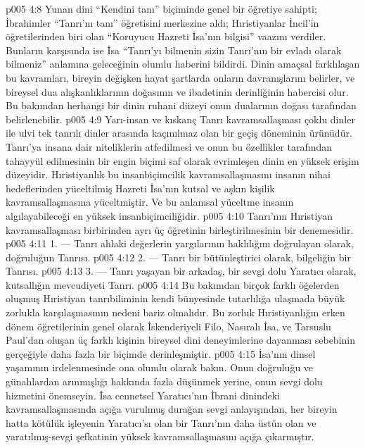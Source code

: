 \vs p005 4:8 Yunan dini “Kendini tanı” biçiminde genel bir öğretiye sahipti; İbrahimler “Tanrı’nı tanı” öğretisini merkezine aldı; Hıristiyanlar İncil’in öğretilerinden biri olan “Koruyucu Hazreti İsa’nın bilgisi” vaazını verdiler. Bunların karşısında ise İsa “Tanrı’yı bilmenin sizin Tanrı’nın bir evladı olarak bilmeniz” anlamına geleceğinin olumlu haberini bildirdi. Dinin amaçsal farklılaşan bu kavramları, bireyin değişken hayat şartlarda onların davranışlarını belirler, ve bireysel dua alışkanlıklarının doğasının ve ibadetinin derinliğinin habercisi olur. Bu bakımdan herhangi bir dinin ruhani düzeyi onun dualarının doğası tarafından belirlenebilir.
\vs p005 4:9 Yarı\hyp{}insan ve kıskanç Tanrı kavramsallaşması çoklu dinler ile ulvi tek tanrılı dinler arasında kaçınılmaz olan bir geçiş döneminin ürünüdür. Tanrı’ya insana dair niteliklerin atfedilmesi ve onun bu özellikler tarafından tahayyül edilmesinin bir engin biçimi saf olarak evrimleşen dinin en yüksek erişim düzeyidir. Hıristiyanlık bu insanbiçimcilik kavramsallaşmasını insanın nihai hedeflerinden yüceltilmiş Hazreti İsa’nın kutsal ve aşkın kişilik kavramsallaşmasına yüceltmiştir. Ve bu anlamsal yüceltme insanın algılayabileceği en yüksek insanbiçimciliğidir.
\vs p005 4:10 Tanrı’nın Hıristiyan kavramsallaşması birbirinden ayrı üç öğretinin birleştirilmesinin bir denemesidir.
\vs p005 4:11 1.\bibnobreakspace {} --- Tanrı ahlaki değerlerin yargılarının haklılığını doğrulayan olarak, doğruluğun Tanrısı.
\vs p005 4:12 2.\bibnobreakspace {} --- Tanrı bir bütünleştirici olarak, bilgeliğin bir Tanrısı.
\vs p005 4:13 3.\bibnobreakspace {} --- Tanrı yaşayan bir arkadaş, bir sevgi dolu Yaratıcı olarak, kutsallığın mevcudiyeti Tanrı.
\vs p005 4:14 Bu bakımdan birçok farklı öğelerden oluşmuş Hıristiyan tanrıbiliminin kendi bünyesinde tutarlılığa ulaşmada büyük zorlukla karşılaşmasının nedeni bariz olmalıdır. Bu zorluk Hıristiyanlığın erken dönem öğretilerinin genel olarak İskenderiyeli Filo, Nasıralı İsa, ve Tarsuslu Paul’dan oluşan üç farklı kişinin bireysel dini deneyimlerine dayanması sebebinin gerçeğiyle daha fazla bir biçimde derinleşmiştir.
\vs p005 4:15 İsa’nın dinsel yaşamının irdelenmesinde ona olumlu olarak bakın. Onun doğruluğu ve günahlardan arınmışlığı hakkında fazla düşünmek yerine, onun sevgi dolu hizmetini önemseyin. İsa cennetsel Yaratıcı’nın İbrani dinindeki kavramsallaşmasında açığa vurulmuş durağan sevgi anlayışından, her bireyin hatta kötülük işleyenin Yaratıcı’sı olan bir Tanrı’nın daha üstün olan  ve yaratılmış\hyp{}sevgi şefkatinin yüksek kavramsallaşmasını açığa çıkarmıştır.
